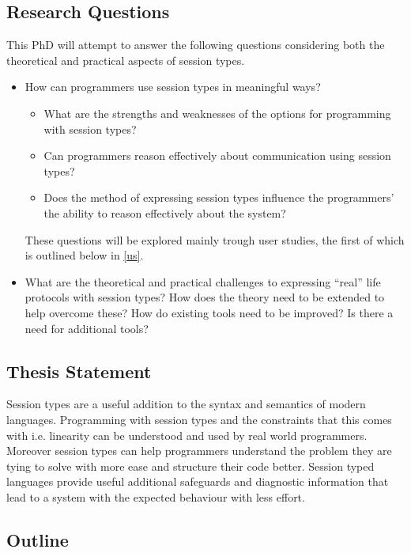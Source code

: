 \subsection{Research Questions}

This PhD will attempt to answer the following questions considering both the theoretical and practical aspects of session types.

\begin{itemize} 
\item How can programmers use session types in meaningful ways?
\begin{itemize}
\item What are the strengths and weaknesses of the options for programming with session types?
\item Can programmers reason effectively about communication using session types?
\item Does the method of expressing session types influence the programmers' the ability to reason effectively about the system?
\end{itemize}
These questions will be explored mainly trough user studies, the first of which is outlined below in \ref{us}.

\item What are the theoretical and practical challenges to expressing “real” life protocols with session types? 
How does the theory need to be extended to help overcome these? How do existing tools need to be improved? Is there a need for additional tools?
\end{itemize}
\subsection{Thesis Statement}

Session types are a useful addition to the syntax and semantics of modern languages. Programming with session types and the constraints that this comes with i.e. linearity can be understood and used by real world programmers. Moreover session types can help programmers understand the problem they are tying to solve with more ease and structure their code better.
Session typed languages provide useful additional safeguards and diagnostic information that lead to a system with the expected behaviour with less effort.

\subsection{Outline}

